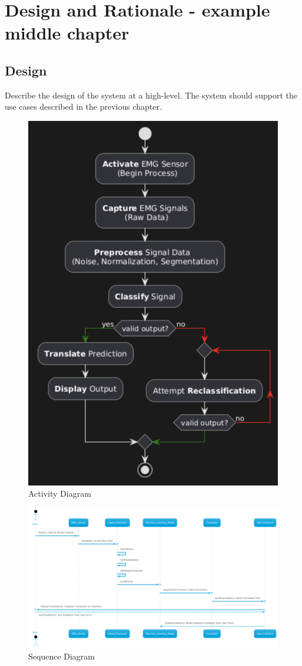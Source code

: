 \chapter{Design and Rationale - example middle chapter}

\section{Design}
Describe the design of the system at a high-level. The system should support the use cases described in the previous chapter.
\begin{figure}
    \centering
    \includegraphics[width=0.5\linewidth]{Images/Activity_Diagram.png}
    \caption{Activity Diagram}
    \label{fig:enter-label}
\end{figure}
\begin{figure}
    \centering
    \includegraphics[width=0.75\linewidth]{Images/Sequence_Diagram.png}
    \caption{Sequence Diagram}
    \label{fig:enter-label}
\end{figure}
